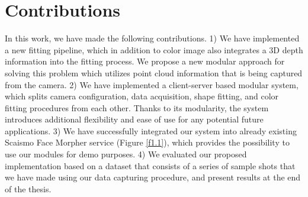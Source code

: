 \section{Contributions}
In this work, we have made the following contributions. 1) We have implemented a new fitting pipeline, which in addition to color image also integrates a 3D depth information into the fitting process. We propose a new modular approach for solving this problem which utilizes point cloud information that is being captured from the camera.  2) We have implemented a client-server based modular system, which splits camera configuration, data acquisition, shape fitting, and color fitting procedures from each other. Thanks to its modularity, the system introduces additional flexibility and ease of use for any potential future applications. 3) We have successfully integrated our system into already existing Scaismo Face Morpher service (Figure \ref{f1.1}), which provides the possibility to use our modules for demo purposes. 4) We evaluated our proposed implementation based on a dataset that consists of a series of sample shots that we have made using our data capturing procedure, and present results at the end of the thesis. 

